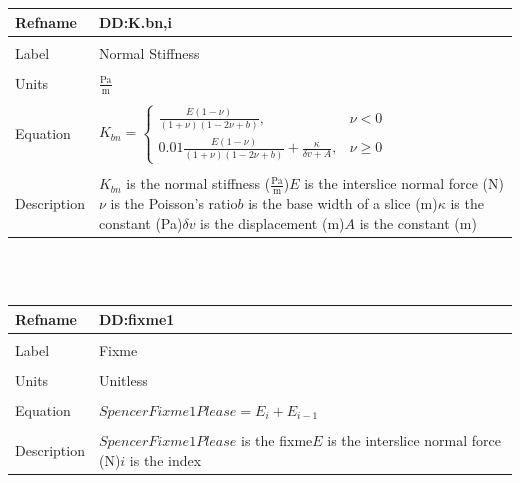 \documentclass[12pt]{article}
\begin{document}
\noindent \begin{minipage}{\textwidth}
\begin{tabular}{p{} p{}}
\toprule \textbf{Refname} & \textbf{DD:K.bn,i}
\label{DD:K.bn,i}
\\ \midrule \\
Label & Normal Stiffness
\\ \midrule \\
Units & $\frac{\text{Pa}}{\text{m}}$
\\ \midrule \\
Equation & ${K_{bn}}=\begin{cases}
\frac{E \left(1-\nu{}\right)}{\left(1+\nu{}\right) \left(1-2 \nu{}+b\right)}, & \nu{}<0\\
0.01 \frac{E \left(1-\nu{}\right)}{\left(1+\nu{}\right) \left(1-2 \nu{}+b\right)}+\frac{\kappa{}}{\delta{}v+A}, & \nu{}\geq{}0
\end{cases}$
\\ \midrule \\
Description & ${K_{bn}}$ is the normal stiffness ($\frac{\text{Pa}}{\text{m}}$)\newline$E$ is the interslice normal force (N)\newline$\nu{}$ is the Poisson's ratio\newline$b$ is the base width of a slice (m)\newline$\kappa{}$ is the constant (Pa)\newline$\delta{}v$ is the displacement (m)\newline$A$ is the constant (m)
\\ \bottomrule \end{tabular}
\end{minipage}\\
~\newline
\noindent \begin{minipage}{\textwidth}
\begin{tabular}{p{} p{}}
\toprule \textbf{Refname} & \textbf{DD:fixme1}
\label{DD:fixme1}
\\ \midrule \\
Label & Fixme
\\ \midrule \\
Units & Unitless
\\ \midrule \\
Equation & $SpencerFixme1Please=E_{i}+E_{i-1}$
\\ \midrule \\
Description & $SpencerFixme1Please$ is the fixme\newline$E$ is the interslice normal force (N)\newline$i$ is the index
\\ \bottomrule \end{tabular}
\end{minipage}\\
\end{document}
